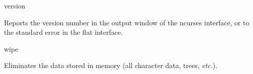 \begin{command}{version}{}

	\syntax{\obligatory{()}}

	\begin{poydescription}
            Reports the \poy version number in the output window of the ncurses
            interface, or to the standard error in the flat interface.
	\end{poydescription}

    \begin{poyexamples}
    \end{poyexamples}
\end{command}

\begin{command}{wipe}{}

	\syntax{\obligatory{()}}

	\begin{poydescription}
        Eliminates the data stored in memory (all character data, trees, \emph{etc.}).
	\end{poydescription}

    \begin{poyexamples}
    \end{poyexamples}
\end{command}
      
